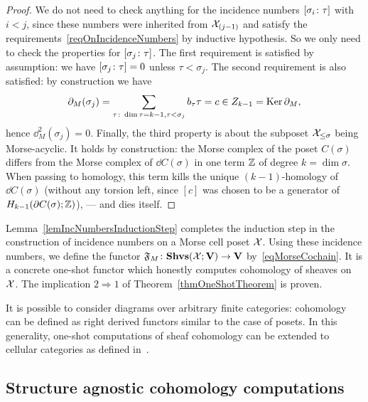 \begin{proof}
We do not need to check anything for the incidence numbers $[\sigma_i\colon \tau]$ with $i<j$, since these numbers were inherited from $\mathcal{X}_{(j-1)}$ and satisfy the requirements~\ref{reqOnIncidenceNumbers} by inductive hypothesis. So we only need to check the properties for $[\sigma_j\colon \tau]$. The first requirement is satisfied by assumption: we have $[\sigma_j\colon \tau]=0$ unless $\tau<\sigma_j$. The second requirement is also satisfied: by construction we have
\[
\dd_M(\sigma_j)=\sum\limits_{\tau\colon \dim\tau=k-1, \tau<\sigma_j}b_\tau \tau=c\in Z_{k-1}=\Ker\dd_M,%
\]
hence $\dd_M^2(\sigma_j)=0$. Finally, the third property is about the subposet $\mathcal{X}_{\leq\sigma}$ being Morse-acyclic. It holds by construction: the Morse complex of the poset $C(\sigma)$ differs from the Morse complex of $\dd C(\sigma)$ in one term $\mathbb{Z}$ of degree $k=\dim\sigma$. When passing to homology, this term kills the unique $(k-1)$-homology of $\dd C(\sigma)$ (without any torsion left, since $[c]$ was chosen to be a generator of $H_{k-1}(\partial C(\sigma);\mathbb{Z})$), --- and dies itself.
\end{proof}

Lemma~\ref{lemIncNumbersInductionStep} completes the induction step in the construction of incidence numbers on a Morse cell poset $\mathcal{X}$. Using these incidence numbers, we define the functor $\mathfrak{F}_M\colon \mathbf{Shvs}(\mathcal{X};\mathbf{V})\to\mathbf{V}$ by~\eqref{eqMorseCochain}. It is a concrete one-shot functor which honestly computes cohomology of sheaves on $\mathcal{X}$. The implication $2\Rightarrow 1$ of Theorem~\ref{thmOneShotTheorem} is proven.

\begin{rem}
It is possible to consider diagrams over arbitrary finite categories: cohomology can be defined as right derived functors similar to the case of posets. In this generality, one-shot computations of sheaf cohomology can be extended to cellular categories as defined in~\cite{CellCat}.
\end{rem}

\subsection{Structure agnostic cohomology computations}\label{subsecMathMinimalComputations}

